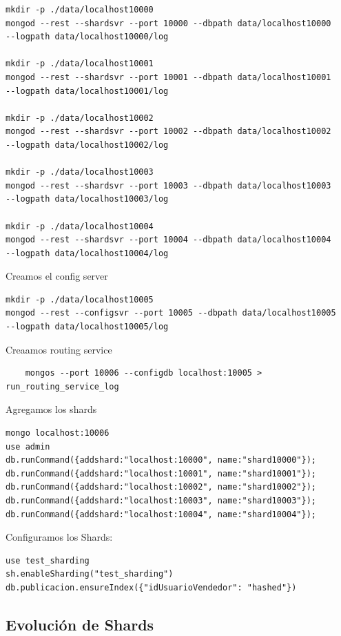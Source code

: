 \documentclass[a4paper, 10pt, twoside]{article}
\begin{document}
\begin{verbatim}
mkdir -p ./data/localhost10000
mongod --rest --shardsvr --port 10000 --dbpath data/localhost10000 
--logpath data/localhost10000/log

mkdir -p ./data/localhost10001
mongod --rest --shardsvr --port 10001 --dbpath data/localhost10001 
--logpath data/localhost10001/log

mkdir -p ./data/localhost10002
mongod --rest --shardsvr --port 10002 --dbpath data/localhost10002 
--logpath data/localhost10002/log

mkdir -p ./data/localhost10003
mongod --rest --shardsvr --port 10003 --dbpath data/localhost10003 
--logpath data/localhost10003/log

mkdir -p ./data/localhost10004
mongod --rest --shardsvr --port 10004 --dbpath data/localhost10004 
--logpath data/localhost10004/log

\end{verbatim}


Creamos el config server 

\begin{verbatim}
mkdir -p ./data/localhost10005
mongod --rest --configsvr --port 10005 --dbpath data/localhost10005 
--logpath data/localhost10005/log
\end{verbatim}

Creaamos routing service

\begin{verbatim}
    mongos --port 10006 --configdb localhost:10005 > run_routing_service_log
\end{verbatim}


Agregamos los shards

\begin{verbatim}
mongo localhost:10006
use admin
db.runCommand({addshard:"localhost:10000", name:"shard10000"});
db.runCommand({addshard:"localhost:10001", name:"shard10001"});
db.runCommand({addshard:"localhost:10002", name:"shard10002"});
db.runCommand({addshard:"localhost:10003", name:"shard10003"});
db.runCommand({addshard:"localhost:10004", name:"shard10004"});
\end{verbatim}

Configuramos los Shards:

\begin{verbatim}
use test_sharding
sh.enableSharding("test_sharding")
db.publicacion.ensureIndex({"idUsuarioVendedor": "hashed"})
\end{verbatim}

\subsection{Evoluci\'on de Shards}
\end{document}
